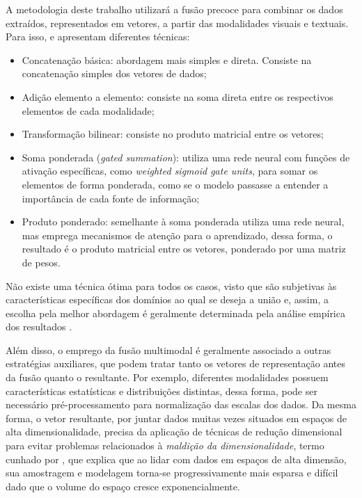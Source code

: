 A metodologia deste trabalho utilizará a fusão precoce para combinar os dados extraídos, representados em vetores, a partir das modalidades visuais e textuais. Para isso, \citeauthor*{multimodalmeta} \cite*{multimodalmeta} e \citeauthor*{multimodalforgery} \cite*{multimodalforgery} apresentam diferentes técnicas:

\begin{itemize}
	\item Concatenação básica: abordagem mais simples e direta. Consiste na concatenação simples dos vetores de dados;
	\item Adição elemento a elemento: consiste na soma direta entre os respectivos elementos de cada modalidade;
	\item Transformação bilinear: consiste no produto matricial entre os vetores;
	\item Soma ponderada (\textit{gated summation}): utiliza uma rede neural com funções de ativação específicas, como \textit{weighted sigmoid gate units}, para somar os elementos de forma ponderada, como se o modelo passasse a entender a importância de cada fonte de informação;
	\item Produto ponderado: semelhante à soma ponderada utiliza uma rede neural, mas emprega mecanismos de atenção para o aprendizado, dessa forma, o resultado é o produto matricial entre os vetores, ponderado por uma matriz de pesos.
\end{itemize}

Não existe uma técnica ótima para todos os casos, visto que são subjetivas às características específicas dos domínios ao qual se deseja a união e, assim, a escolha pela melhor abordagem é geralmente determinada pela análise empírica dos resultados \cite{multimodalmeta}.

Além disso, o emprego da fusão multimodal é geralmente associado a outras estratégias auxiliares, que podem tratar tanto os vetores de representação antes da fusão quanto o resultante. Por exemplo, diferentes modalidades possuem características estatísticas e distribuições distintas, dessa forma, pode ser necessário pré-processamento para normalização das escalas dos dados. Da mesma forma, o vetor resultante, por juntar dados muitas vezes situados em espaços de alta dimensionalidade, precisa da aplicação de técnicas de redução dimensional para evitar problemas relacionados à \textit{maldição da dimensionalidade}, termo cunhado por \citeauthor*{bellmancurse} \cite*{bellmancurse}, que explica que ao lidar com dados em espaços de alta dimensão, sua amostragem e modelagem torna-se progressivamente mais esparsa e difícil dado que o volume do espaço cresce exponencialmente.


